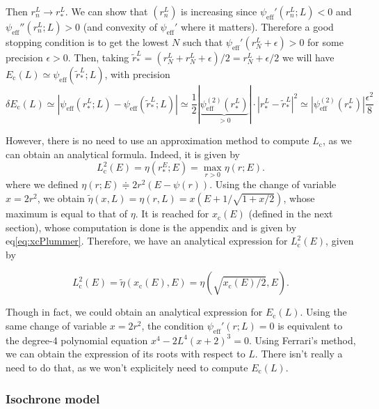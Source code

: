 \documentclass[11pt]{article}
\newcommand{\rc}{\mathrm{c}}
\newcommand{\psieff}{\psi_{\mathrm{eff}}}
\newcommand{\Ec}{E_{{\mathrm{c}}}}
\newcommand{\Lc}{L_{{\mathrm{c}}}}
\newcommand{\xc}{x_{\rc}}
\begin{document}
Then $r_{n}^{L}\rightarrow r_{*}^{L}$. We can show that $(r_{n}^{L})$
is increasing since $\psieff'(r_{n}^{L};L)<0$ and $\psieff''(r_{n}^{L};L)>0$
(and convexity of $\psieff'$ where it matters). Therefore
a good stopping condition is to get the lowest $N$ such that $\psieff'(r_{N}^{L}+\epsilon)>0$
for some precision $\epsilon>0$. Then, taking $\tilde{r}_{*}^{L}=(r_{N}^{L}+r_{N}^{L}+\epsilon)/2=r_{N}^{L}+\epsilon/2$
we will have $\Ec(L)\simeq\psieff(\tilde{r}_{*}^{L};L)$,
with precision 
\begin{equation}
\delta \Ec(L)\simeq|\psieff(r_{*}^{L};L)-\psieff(\tilde{r}_{*}^{L};L)|\simeq\frac{1}{2}|\underbrace{\psieff^{(2)}(r_{*}^{L})}_{>0}|\cdot|r_{*}^{L}-\tilde{r}_{*}^{L}|^{2}\simeq|\psieff^{(2)}(r_{*}^{L})|\frac{\epsilon^{2}}{8}
\label{eq:precision_Ec}
\end{equation}

However, there is no need to use an approximation method to compute $\Lc$, as we can obtain an analytical formula. Indeed, it is given by
\begin{equation}
\Lc^{2}(E)=\eta(r_{*}^{E};E)=\max_{r>0}\eta(r;E).
\label{eq:angular_circular}
\end{equation}
where we defined $\eta(r;E)\doteqdot 2 r^{2}(E-\psi(r))$. Using the change of variable $x=2r^{2}$, we obtain $\tilde{\eta}(x,L)=\eta(r,L)=x(E+1/\sqrt{1+x/2})$, whose maximum is equal to that of $\eta$. It is reached for $\xc(E)$ (defined in the next section), whose computation is done is the appendix and is given by eq\eqref{eq:xcPlummer}. Therefore, we have an analytical expression for $\Lc^{2}(E)$, given by

\begin{equation}
  \Lc^{2}(E) =\tilde{\eta}(\xc(E),E) =\eta(\sqrt{\xc(E)/2},E) .
  \label{eq:Lc_analytical_Plummer}
  \end{equation}

Though in fact, we could obtain an analytical expression for $\Ec(L)$. Using the same change of variable $x=2r^{2}$, the condition $\psieff'(r;L)=0$ is equivalent to the degree-4 polynomial equation $x^{4}-2L^{4}(x+2)^{3}=0$. Using Ferrari's method, we can obtain the expression of its roots with respect to $L$. There isn't really a need to do that, as we won't explicitely need to compute $\Ec(L)$.

\subsubsection{Isochrone model}
\label{subsubsec:IsoCircularOrbit}
\end{document}
